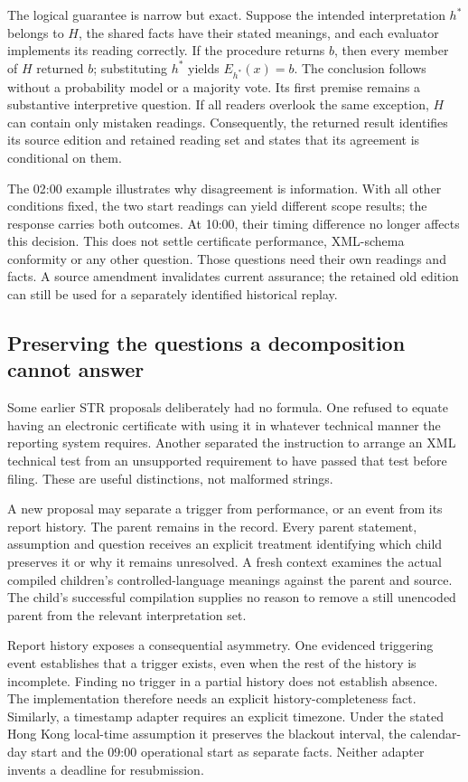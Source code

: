 The logical guarantee is narrow but exact. Suppose the intended interpretation
$h^*$ belongs to $H$, the shared facts have their stated meanings, and each
evaluator implements its reading correctly. If the procedure returns $b$,
then every member of $H$ returned $b$; substituting $h^*$ yields
$E_{h^*}(x)=b$. The conclusion follows without a probability model or a majority
vote. Its first premise remains a substantive interpretive question. If all
readers overlook the same exception, $H$ can contain only mistaken readings.
Consequently, the returned result identifies its source edition and retained
reading set and states that its agreement is conditional on them.

The 02:00 example illustrates why disagreement is information. With all other
conditions fixed, the two start readings can yield different scope results;
the response carries both outcomes. At 10:00, their timing difference no longer
affects this decision. This does not settle certificate performance, XML-schema
conformity or any other question. Those questions need their own readings and
facts. A source amendment invalidates current assurance; the retained old
edition can still be used for a separately identified historical replay.

\subsection{Preserving the questions a decomposition cannot answer}

Some earlier STR proposals deliberately had no formula. One refused to equate
having an electronic certificate with using it in whatever technical manner
the reporting system requires. Another separated the instruction to arrange
an XML technical test from an unsupported requirement to have passed that
test before filing. These are useful distinctions, not malformed strings.

A new proposal may separate a trigger from performance, or an event from its
report history. The parent remains in the record. Every parent statement,
assumption and question receives an explicit treatment identifying which child
preserves it or why it remains unresolved. A fresh context examines the actual
compiled children's controlled-language meanings against the parent and source.
The child's successful compilation supplies no reason to remove a still
unencoded parent from the relevant interpretation set.

Report history exposes a consequential asymmetry. One evidenced triggering
event establishes that a trigger exists, even when the rest of the history is
incomplete. Finding no trigger in a partial history does not establish absence.
The implementation therefore needs an explicit history-completeness fact.
Similarly, a timestamp adapter requires an explicit timezone. Under the stated
Hong Kong local-time assumption it preserves the blackout interval, the
calendar-day start and the 09:00 operational start as separate facts. Neither
adapter invents a deadline for resubmission.

